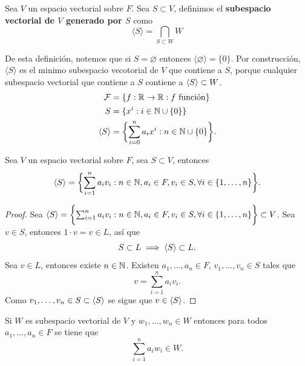 \documentclass[12pt,a4paper]{book}
\begin{document}
    \begin{definicion}
        Sea $V$ un espacio vectorial sobre $F$. Sea $S\subset V$, definimos el \textbf{subespacio vectorial de
        $V$ generado por $S$} como
        \begin{equation*}
            \langle S \rangle=\bigcap_{S\subset W}W
        \end{equation*}
    \end{definicion}

    De esta definición, notemos que si $S=\varnothing$ entonces $\langle\varnothing\rangle=\{0\}$.
    Por construcción, $\langle S\rangle$ es el minimo subespacio vecotorial de $V$ que contiene
    a $S$, porque cualquier subespacio vectorial que contiene a $S$ contiene a $\langle S \rangle\subset W$.
    \begin{align*}
        \mathcal{F}&=\{f:\mathbb{R}\to\mathbb{R}:f\text{ función}\}\\
        S&=\{x^{i}:i\in\mathbb{N}\cup\{0\}\}\\
        \langle S \rangle&=\biggl\{\sum_{i=0}^{n}a_{i}x^{i}:n\in\mathbb{N}\cup\{0\}\biggr\}.
    \end{align*}

    \begin{proposicion}
        Sea $V$ un espacio vectorial sobre $F$, sea $S\subset V$, entonces
        \begin{equation*}
            \langle S \rangle=\biggl\{\sum_{i=1}^{n}a_{i}v_{i}:n\in\mathbb{N},a_{i}\in F,v_{i}\in S,\forall i\in\{1,\dots,n\}\biggr\}.
        \end{equation*}
    \end{proposicion}

    \begin{proof}
        Sea $\langle S \rangle=\biggl\{\sum_{i=1}^{n}a_{i}v_{i}:n\in\mathbb{N},a_{i}\in F,v_{i}\in S,\forall i\in\{1,\dots,n\}\biggr\}\subset V$.
        Sea $v\in S$, entonces $1\cdot v=v\in L$, así que
        \begin{equation*}
            S\subset L\implies\langle S \rangle\subset L.
        \end{equation*}
        Sea $v\in L$, entonces existe $n\in\mathbb{N}$. Existen $a_{1},\dots,a_{n}\in F$, $v_{1},\dots,v_{n}\in S$
        tales que
        \begin{equation*}
            v=\sum_{i=1}^{n}a_{i}v_{i}.
        \end{equation*}
        Como $v_{1},\dots,v_{n}\in S\subset\langle S \rangle$ se sigue que $v\in\langle S \rangle$.
    \end{proof}

    \begin{lema}
        Si $W$ es subespacio vectorial de $V$ y $w_{1},\dots,w_{n}\in W$ entonces para todos
        $a_{1},\dots,a_{n}\in F$ se tiene que
        \begin{equation*}
            \sum_{i=1}^{n}a_{i}w_{i}\in W.
        \end{equation*}
    \end{lema}
\end{document}
